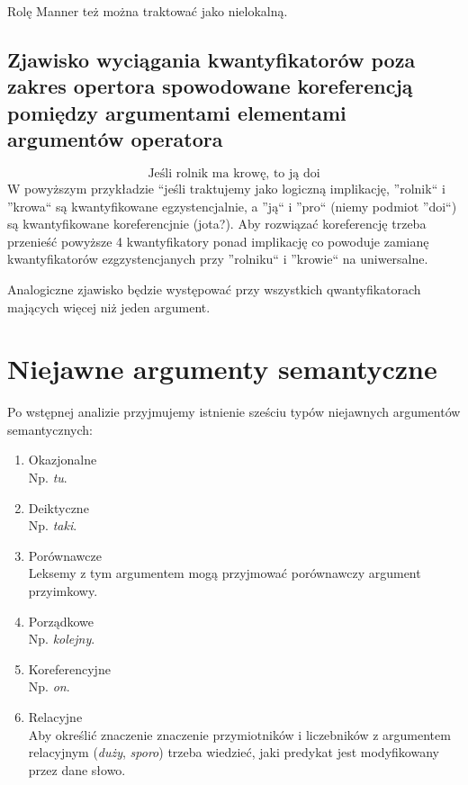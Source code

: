 \documentclass[a4paper, 12pt]{article}
\theoremstyle{remark}
\begin{document}
Rolę Manner też można traktować jako nielokalną.

\subsection{Zjawisko wyciągania kwantyfikatorów poza zakres opertora spowodowane koreferencją pomiędzy argumentami elementami argumentów operatora}
\begin{equation}
	\text{Jeśli rolnik ma krowę, to ją doi}
\end{equation}
W powyższym przykładzie ``jeśli traktujemy jako logiczną implikację, ''rolnik`` i ''krowa`` są kwantyfikowane egzystencjalnie, a 
''ją`` i ''pro`` (niemy podmiot ''doi``) są kwantyfikowane koreferencjnie (jota?). 
Aby rozwiązać koreferencję trzeba przenieść powyższe 4 kwantyfikatory ponad implikację co powoduje
zamianę kwantyfikatorów  ezgzystencjanych przy ''rolniku`` i ''krowie`` na uniwersalne. 

Analogiczne zjawisko będzie występować przy wszystkich qwantyfikatorach mających więcej niż jeden argument.

\section{Niejawne argumenty semantyczne} %

Po wstępnej analizie przyjmujemy istnienie sześciu typów niejawnych argumentów semantycznych:

\begin{enumerate}
\item Okazjonalne \\ Np. \emph{tu}.
\item Deiktyczne\\ Np. \emph{taki}.
\item Porównawcze \\ Leksemy z tym argumentem mogą przyjmować porównawczy argument przyimkowy.
\item Porządkowe \\ Np. \emph{kolejny}.
\item Koreferencyjne \\ Np. \emph{on}.
\item Relacyjne \\ Aby określić znaczenie znaczenie przymiotników i liczebników z argumentem relacyjnym (\emph{duży}, \emph{sporo}) trzeba wiedzieć, jaki predykat jest modyfikowany przez dane słowo.
\end{enumerate}
\end{document}
